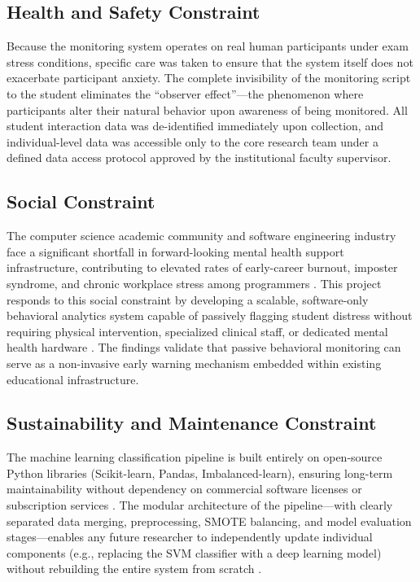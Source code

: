 \subsection{Health and Safety Constraint}
Because the monitoring system operates on real human participants under exam stress conditions, specific care was taken to ensure that the system itself does not exacerbate participant anxiety. The complete invisibility of the monitoring script to the student eliminates the ``observer effect''---the phenomenon where participants alter their natural behavior upon awareness of being monitored. All student interaction data was de-identified immediately upon collection, and individual-level data was accessible only to the core research team under a defined data access protocol approved by the institutional faculty supervisor.

\subsection{Social Constraint}
The computer science academic community and software engineering industry face a significant shortfall in forward-looking mental health support infrastructure, contributing to elevated rates of early-career burnout, imposter syndrome, and chronic workplace stress among programmers \cite{mdpi5739, codereview2024, stemedu2025}. This project responds to this social constraint by developing a scalable, software-only behavioral analytics system capable of passively flagging student distress without requiring physical intervention, specialized clinical staff, or dedicated mental health hardware \cite{selfreg2023}. The findings validate that passive behavioral monitoring can serve as a non-invasive early warning mechanism embedded within existing educational infrastructure.

\subsection{Sustainability and Maintenance Constraint}
The machine learning classification pipeline is built entirely on open-source Python libraries (Scikit-learn, Pandas, Imbalanced-learn), ensuring long-term maintainability without dependency on commercial software licenses or subscription services \cite{rahimi2024ai}. The modular architecture of the pipeline---with clearly separated data merging, preprocessing, SMOTE balancing, and model evaluation stages---enables any future researcher to independently update individual components (e.g., replacing the SVM classifier with a deep learning model) without rebuilding the entire system from scratch \cite{arean2025generalizable}.

